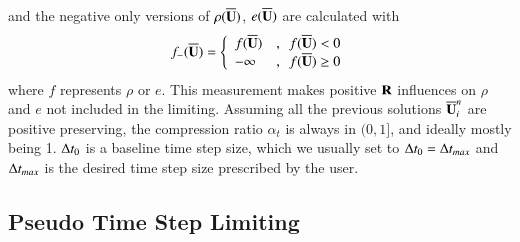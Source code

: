 \documentclass[preprint,12pt]{elsarticle}
\begin{document}
and the negative only versions of $\rho(\overline{\mathbf{U}})$, $e(\overline{\mathbf{U}})$
are calculated with
\begin{equation}
    f_-(\overline{\mathbf{U}}) =
    \left\{
    \begin{array}{ll}
        f(\overline{\mathbf{U}})  & ,\ \   f(\overline{\mathbf{U}}) < 0    \\
        -\infty & ,\ \   f(\overline{\mathbf{U}}) \geq 0 \\
    \end{array}
    \right.
\end{equation}
where $f$ represents $\rho$ or $e$.
This measurement makes positive $\mathbf{R}$ influences
on $\rho$ and $e$ not included in the limiting.
Assuming all the previous solutions $\overline{\mathbf{U}}^n_i$ 
are positive preserving,
the compression ratio $\alpha_t$ is always in 
$(0,1]$, and ideally mostly being 1.  
$\mathrm\Delta t_0$ is a baseline time step size, which 
we usually set to $\mathrm\Delta t_0 = \mathrm\Delta t_{max}$
and $\mathrm\Delta t_{max}$ is the desired time step size
prescribed by the user.

\subsection{Pseudo Time Step Limiting}
\end{document}
